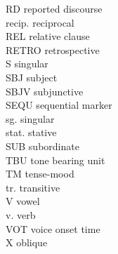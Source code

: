 \begin{multicols}{2}
RD \hfill reported discourse \\
recip. \hfill reciprocal \\
REL \hfill relative clause \\
RETRO \hfill retrospective \\
S  \hfill singular    \\
SBJ \hfill subject \\
SBJV  \hfill subjunctive    \\
SEQU \hfill sequential marker \\
sg. \hfill singular \\
stat. \hfill stative \\
SUB \hfill subordinate \\
TBU  \hfill tone bearing unit    \\
TM \hfill tense-mood \\
tr. \hfill transitive \\
V \hfill vowel   \\
v. \hfill verb   \\
VOT \hfill voice onset time \\
X \hfill oblique \\
\end{multicols}
